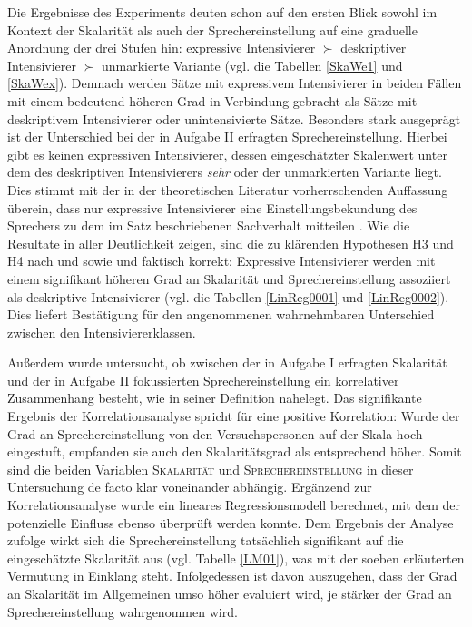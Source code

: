 Die Ergebnisse des Experiments deuten schon auf den ersten Blick sowohl im Kontext der Skalarität als auch der Sprechereinstellung auf eine graduelle Anordnung der drei Stufen hin: expressive Intensivierer $\succ$ deskriptiver Intensivierer $\succ$ unmarkierte Variante (vgl. die Tabellen \ref{SkaWe1} und \ref{SkaWex}). Demnach werden Sätze mit expressivem Intensivierer in beiden Fällen mit einem bedeutend höheren Grad in Verbindung gebracht als Sätze mit deskriptivem Intensivierer oder unintensivierte Sätze. Besonders stark ausgeprägt ist der Unterschied bei der in Aufgabe II erfragten Sprechereinstellung. Hierbei gibt es keinen expressiven Intensivierer, dessen eingeschätzter Skalenwert unter dem des deskriptiven Intensivierers \textit{sehr} oder der unmarkierten Variante liegt. Dies stimmt mit der in der theoretischen Literatur vorherrschenden Auffassung überein, dass nur expressive Intensivierer eine Einstellungsbekundung des Sprechers zu dem im Satz beschriebenen Sachverhalt mitteilen \citep[vgl.][133]{Gutzmann.2019a}. Wie die Resultate in aller Deutlichkeit zeigen, sind die zu klärenden Hypothesen H3 und H4 nach \citet[22]{Paradis.1997} und \citet[133]{Gutzmann.2019a} sowie \citet[315]{Lang.1983} und \citet[57]{Ortner.2014} faktisch korrekt: Expressive Intensivierer werden mit einem signifikant höheren Grad an Skalarität und Sprechereinstellung assoziiert als deskriptive Intensivierer (vgl. die Tabellen \ref{LinReg0001} und \ref{LinReg0002}). Dies liefert Bestätigung für den angenommenen wahrnehmbaren Unterschied zwischen den Intensiviererklassen.

\largerpage
Außerdem wurde untersucht, ob zwischen der in Aufgabe I erfragten Skalarität und der in Aufgabe II fokussierten Sprechereinstellung ein korrelativer Zusammenhang besteht, wie \citet[133]{Gutzmann.2019a} in seiner Definition nahelegt. Das signifikante Ergebnis der Korrelationsanalyse spricht für eine positive Korrelation: Wurde der Grad an Sprechereinstellung von den Versuchspersonen auf der Skala hoch eingestuft, empfanden sie auch den Skalaritätsgrad als entsprechend höher. Somit sind die beiden Variablen \textsc{Skalarität} und \textsc{Sprechereinstellung} in dieser Untersuchung de facto klar voneinander abhängig. Ergänzend zur Korrelationsanalyse wurde ein lineares Regressionsmodell berechnet, mit dem der potenzielle Einfluss ebenso überprüft werden konnte. Dem Ergebnis der Analyse zufolge wirkt sich die Sprechereinstellung tatsächlich signifikant auf die eingeschätzte Skalarität aus (vgl. Tabelle \ref{LM01}), was mit der soeben erläuterten Vermutung in Einklang steht. Infolgedessen ist davon auszugehen, dass der Grad an Skalarität im Allgemeinen umso höher evaluiert wird, je stärker der Grad an Sprechereinstellung wahrgenommen wird.


